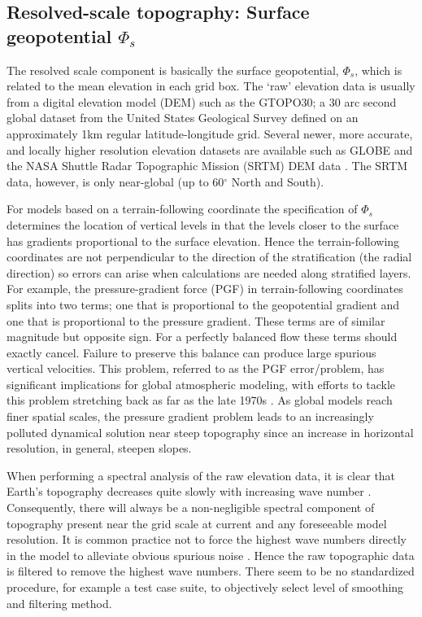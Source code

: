 \documentclass[gmd]{copernicus}
\begin{document}
\subsection{Resolved-scale topography: Surface geopotential $\Phi_s$}
The resolved scale component is basically the surface geopotential, $\Phi_s$, which is related to the mean elevation in each grid box. The `raw' elevation data is usually from a digital elevation model (DEM) such as the GTOPO30; a 30 arc second global dataset from the United States Geological Survey \citep[USGS; ][]{USGS} defined on an approximately 1km regular latitude-longitude grid. Several newer, more accurate, and locally higher resolution elevation datasets are available such as GLOBE \citep{GLOBE} and the NASA Shuttle Radar Topographic Mission (SRTM) DEM data \citep{SRTM}. The SRTM data, however, is only near-global (up to 60$^\circ$ North and South).

For models based on a terrain-following coordinate the specification of $\Phi_s$ determines the location of vertical levels in that the levels closer to the surface has gradients proportional to the surface elevation. Hence the terrain-following coordinates are not perpendicular to the direction of the stratification (the radial direction) so errors can arise when calculations are needed along stratified layers. For example, the pressure-gradient force (PGF) in terrain-following coordinates splits into two terms; one that is proportional to the geopotential gradient and one that is proportional to the pressure gradient. These terms are of similar magnitude but opposite sign. For a perfectly balanced flow these terms should exactly cancel. Failure to preserve this balance can produce large spurious vertical velocities. This problem, referred to as the PGF error/problem, has significant implications for global atmospheric modeling, with efforts to tackle this problem stretching back as far as the late 1970s \citep{ZIJ1977BzPdA, DTMZIJ1986MAP}.  As global models reach finer spatial scales, the pressure gradient problem leads to an increasingly polluted dynamical solution near steep topography since an increase in horizontal resolution, in general, steepen slopes. 

When performing a spectral analysis of the raw elevation data, it is clear that Earth's topography decreases quite slowly with increasing wave number \citet[see, e.g., ][]{B1993GRL}. Consequently, there will always be a non-negligible spectral component of topography present near the grid scale at current and any foreseeable model resolution. It is common practice not to force the highest wave numbers directly in the model to alleviate obvious spurious noise \citep[e.g.][]{NSM1994JC,LH1997MWR}. Hence the raw topographic data is filtered to remove the highest wave numbers. There seem to be no standardized procedure, for example a test case suite, to objectively select level of smoothing and filtering method. 
\end{document}
